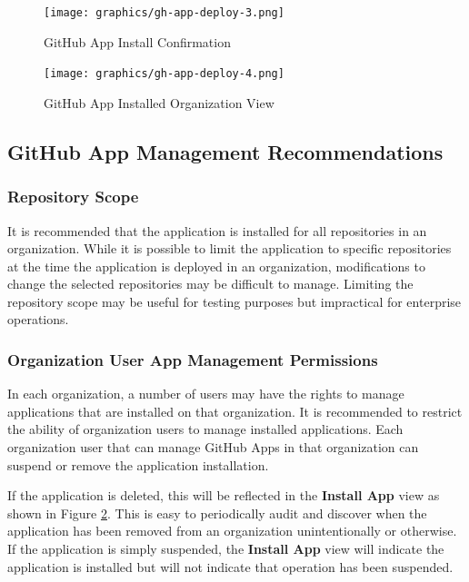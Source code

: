 \begin{figure}[ht]
    \texttt{[image: graphics/gh-app-deploy-3.png]}
    \caption{GitHub App Install Confirmation}
    \label{fig:gh-app-deploy-3}
\end{figure}

\begin{figure}[ht]
    \texttt{[image: graphics/gh-app-deploy-4.png]}
    \caption{GitHub App Installed Organization View}
    \label{fig:gh-app-deploy-4}
\end{figure}

\FloatBarrier

\subsection{GitHub App Management Recommendations}

\subsubsection{Repository Scope}

It is recommended that the application is installed for all repositories in an organization.  While it is possible to limit the
application to specific repositories at the time the application is deployed in an organization, modifications to change the
selected repositories may be difficult to manage.  Limiting the repository scope may be useful for testing purposes but impractical
for enterprise operations.

\subsubsection{Organization User App Management Permissions}

In each organization, a number of users may have the rights to manage applications that are installed on that organization.  It is
recommended to restrict the ability of organization users to manage installed applications.  Each organization user that can manage
GitHub Apps in that organization can suspend or remove the \cxoneflow application installation.

If the \cxoneflow application is deleted, this will be reflected in the \textbf{Install App} view as shown in Figure \ref{fig:gh-app-deploy-4}.
This is easy to periodically audit and discover when the application has been removed from an organization unintentionally or otherwise.
If the application is simply suspended, the \textbf{Install App} view will indicate the application is installed but will not indicate
that operation has been suspended.

